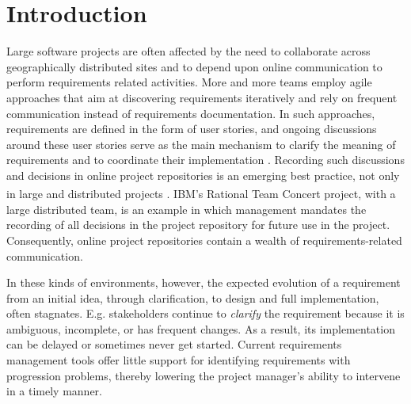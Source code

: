 \section{Introduction}

Large software projects are often affected by the need to collaborate across geographically distributed sites and to depend upon online communication to perform requirements related activities. 
More and more teams employ agile approaches that aim at discovering requirements iteratively and rely on frequent communication instead of requirements documentation. 
In such approaches, requirements are defined in the form of user stories, and ongoing discussions around these user stories serve as the main mechanism to clarify the meaning of requirements and to coordinate their implementation \cite{Cao2008}. 
Recording such discussions and decisions in online project repositories is an emerging best practice, not only in large and distributed projects \cite{Aranda2007}.
IBM\textsuperscript{\textregistered}'s Rational Team Concert\textsuperscript{\textregistered} project, with a large distributed team, is an example in which management mandates the recording of all decisions in the project repository for future use in the project\cite{Frost2007}. 
Consequently, online project repositories contain a wealth of requirements-related communication.

In these kinds of environments, however, the expected evolution of a requirement from an initial idea, through clarification, to design and full implementation, often stagnates. 
E.g. stakeholders continue to \emph{clarify} the requirement because it is ambiguous, incomplete, or has frequent changes. 
As a result, its implementation can be delayed or sometimes never get started. 
Current requirements management tools offer little support for identifying requirements with progression problems, thereby lowering the project manager's  ability to intervene in a timely manner.

